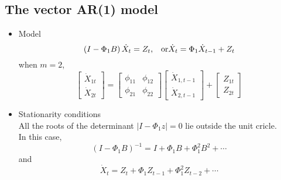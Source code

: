 \documentclass{article}
\begin{document}
\subsection{The vector AR(1) model}
\begin{itemize}
	\item Model
	\begin{equation*}
	\left(I-\Phi_{1} B\right) \dot{X}_{t}=Z_{t} \text{,\quad or} \dot{X}_{t}=\Phi_{1} \dot{X}_{t-1}+Z_{t}
	\end{equation*}
	when $m = 2$,
	\begin{equation*}
	\left[ \begin{array}{c}{\dot{X}_{1 t}} \\ {\dot{X}_{2 t}}\end{array}\right]=\left[ \begin{array}{cc}{\phi_{11}} & {\phi_{12}} \\ {\phi_{21}} & {\phi_{22}}\end{array}\right] \left[ \begin{array}{c}{\dot{X}_{1, t-1}} \\ {\dot{X}_{2, t-1}}\end{array}\right]+\left[ \begin{array}{c}{Z_{1 t}} \\ {Z_{2 t}}\end{array}\right]
	\end{equation*}
	
	\item Stationarity conditions\\
	
	\noindent All the roots of the determinant $\left|I-\Phi_{1} z\right|=0$ lie outside the unit cricle.\\
	
	\noindent In this case,
	\begin{equation*}
	\left(I-\Phi_{1} B\right)^{-1}=I+\Phi_{1} B+\Phi_{1}^{2} B^{2}+\cdots
	\end{equation*}
	and
	\begin{equation*}
	\dot{X}_{t}=Z_{t}+\Phi_{1} Z_{t-1}+\Phi_{1}^{2} Z_{t-2}+\cdots
	\end{equation*}
	

\end{itemize}
\end{document}
